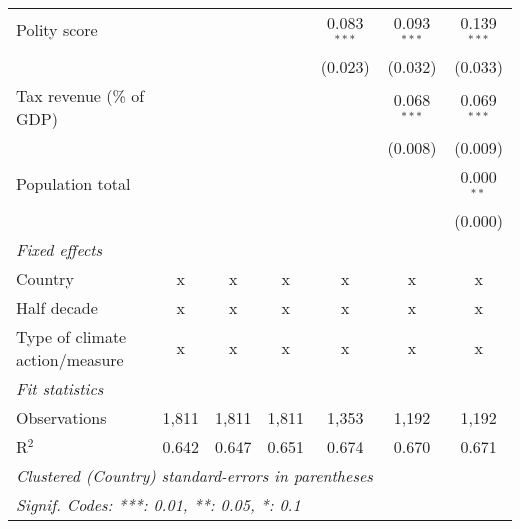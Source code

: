 \begin{tabular}{lcccccc}
   Polity score                                                  &         &                &                & 0.083$^{***}$  & 0.093$^{***}$  & 0.139$^{***}$\\   
                                                                 &         &                &                & (0.023)        & (0.032)        & (0.033)\\   
   Tax revenue (\% of GDP)                                       &         &                &                &                & 0.068$^{***}$  & 0.069$^{***}$\\   
                                                                 &         &                &                &                & (0.008)        & (0.009)\\   
   Population total                                              &         &                &                &                &                & 0.000$^{**}$\\   
                                                                 &         &                &                &                &                & (0.000)\\   
   \emph{Fixed effects}\\
   Country                                                       & x       & x              & x              & x              & x              & x\\  
   Half decade                                                   & x       & x              & x              & x              & x              & x\\  
   Type of climate action/measure                                & x       & x              & x              & x              & x              & x\\  
   \midrule \emph{Fit statistics}\\
   Observations                                                  & 1,811   & 1,811          & 1,811          & 1,353          & 1,192          & 1,192\\  
   R$^2$                                                         & 0.642   & 0.647          & 0.651          & 0.674          & 0.670          & 0.671\\  
   \midrule
   \multicolumn{7}{l}{\emph{Clustered (Country) standard-errors in parentheses}}\\
   \multicolumn{7}{l}{\emph{Signif. Codes: ***: 0.01, **: 0.05, *: 0.1}}\\
\end{tabular}
\par\endgroup


